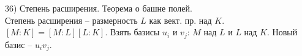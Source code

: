 36) Степень расширения. Теорема о башне полей.\\
Степень расширения -- размерность $L$ как вект. пр. над $K$. $[M:K] = [M:L][L:K]$.
Взять базисы $u_i$ и $v_j$: $M$ над $L$ и $L$ над $K$. Новый базис -- $u_iv_j$.
\\
